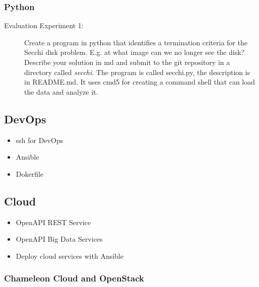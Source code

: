 \subsubsection{Python}



\begin{description}
\item[Evaluation Experiment 1:] Create a program in python that
  identifies a termination criteria for the Secchi disk
  problem. E.g. at what image can we no longer see the disk?
  Describe your solution in md and submit to the git repository in a
  directory called {\em secchi}. The program is called secchi.py, the
  description is in README.md. It uses cmd5 for creating a command
  shell that can load the data and analyze it. 
\end{description}

\subsection{DevOps}

\begin{itemize}
\item ssh for DevOps
\item Ansible
\item Dokerfile
\end{itemize}

\subsection{Cloud}


\begin{itemize}
\item OpenAPI REST Service
\item OpenAPI Big Data Services
\item Deploy cloud services with Ansible
\end{itemize}

\subsubsection{Chameleon Cloud and OpenStack}

